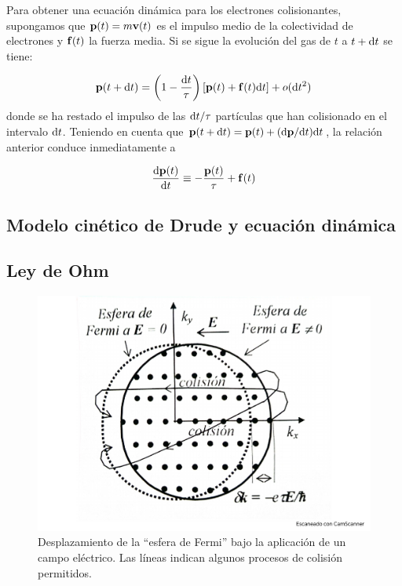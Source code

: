 Para obtener una ecuación dinámica para los electrones colisionantes, supongamos que $\mathbf{p}(t)= m \mathbf{v}(t)$ es el impulso medio de la colectividad de electrones y $\mathbf{f}(t)$ la fuerza media. Si se sigue la evolución del gas de $t$ a $t+\mathrm{d} t$ se tiene:

\begin{equation}
	\mathbf{p} (t+\mathrm{d} t) = \left( 1-\frac{\mathrm{d} t}{\tau} \right) \left[ \mathbf{p}(t)+\mathbf{f}(t)\mathrm{d} t \right] + o(\mathrm{d} t^2)
\end{equation}
donde se ha restado el impulso de las $\mathrm{d} t/\tau$ partículas que han colisionado en el intervalo $\mathrm{d} t$. Teniendo en cuenta que $\mathbf{p}(t+\mathrm{d} t)=\mathbf{p}(t)+(\mathrm{d} \mathbf{p} / \mathrm{d} t)\mathrm{d} t$, la relación anterior conduce inmediatamente a 

\begin{equation}
	\frac{\mathrm{d} \mathbf{p}(t)}{\mathrm{d} t} \equiv - \frac{\mathbf{p}(t)}{\tau} +  \mathbf{f}(t)	
\end{equation}


\subsection{Modelo cinético de Drude y ecuación dinámica}

\subsection{Ley de Ohm}
\begin{figure}[h!] \centering
    \includegraphics[scale=0.5]{Cuerpo/Ch_06/Fotos libro 5.pdf}
    \caption{Desplazamiento de la ``esfera de Fermi'' bajo la aplicación de un campo eléctrico. Las líneas indican algunos procesos de colisión permitidos.}
    \label{Fig:06-05}
\end{figure}  

